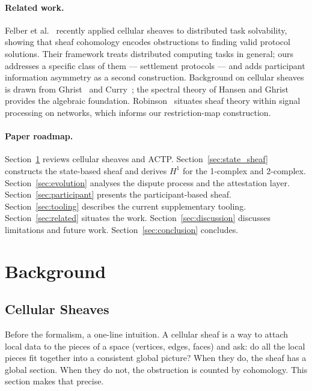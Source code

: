 \documentclass[11pt]{article}
\theoremstyle{plain}
\theoremstyle{definition}
\newcommand{\Hone}{H^{1}}
\begin{document}
\paragraph{Related work.}
Felber et al.~\cite{Felber2025} recently applied cellular sheaves to
distributed task solvability, showing that sheaf cohomology encodes
obstructions to finding valid protocol solutions.  Their framework treats
distributed computing tasks in general; ours addresses a specific class of
them --- settlement protocols --- and adds participant information asymmetry
as a second construction.  Background on cellular sheaves is drawn from
Ghrist~\cite{Ghrist2014} and Curry~\cite{Curry2014}; the spectral theory of
Hansen and Ghrist~\cite{HansenGhrist2019} provides the algebraic foundation.
Robinson~\cite{Robinson2014} situates sheaf theory within signal processing
on networks, which informs our restriction-map construction.

\paragraph{Paper roadmap.}
Section~\ref{sec:background} reviews cellular sheaves and ACTP.
Section~\ref{sec:state_sheaf} constructs the state-based sheaf and derives
$\Hone$ for the 1-complex and 2-complex.
Section~\ref{sec:evolution} analyses the dispute process and the attestation
layer.
Section~\ref{sec:participant} presents the participant-based sheaf.
Section~\ref{sec:tooling} describes the current supplementary tooling.
Section~\ref{sec:related} situates the work.
Section~\ref{sec:discussion} discusses limitations and future work.
Section~\ref{sec:conclusion} concludes.

\section{Background}
\label{sec:background}

\subsection{Cellular Sheaves}
\label{sec:sheaves}

Before the formalism, a one-line intuition.  A cellular sheaf is a way to
attach local data to the pieces of a space (vertices, edges, faces) and ask:
do all the local pieces fit together into a consistent global picture?  When
they do, the sheaf has a global section.  When they do not, the obstruction
is counted by cohomology.  This section makes that precise.
\end{document}
